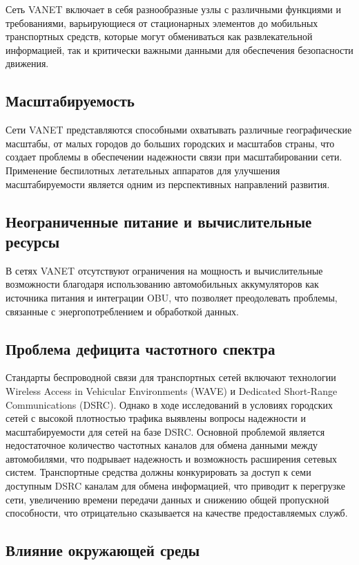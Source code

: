 Сеть VANET включает в себя разнообразные узлы с различными функциями и требованиями, варьирующиеся от стационарных элементов до мобильных транспортных средств, которые могут обмениваться как развлекательной информацией, так и критически важными данными для обеспечения безопасности движения.

\subsection*{Масштабируемость}

Сети VANET представляются способными охватывать различные географические масштабы, от малых городов до больших городских и масштабов страны, что создает проблемы в обеспечении надежности связи при масштабировании сети. Применение беспилотных летательных аппаратов для улучшения масштабируемости является одним из перспективных направлений развития.

\subsection*{Неограниченные питание и вычислительные ресурсы}

В сетях VANET отсутствуют ограничения на мощность и вычислительные возможности благодаря использованию автомобильных аккумуляторов как источника питания и интеграции OBU, что позволяет преодолевать проблемы, связанные с энергопотреблением и обработкой данных.

\subsection*{Проблема дефицита частотного спектра}

Стандарты беспроводной связи для транспортных сетей включают технологии Wireless Access in Vehicular Environments (WAVE) и Dedicated Short-Range Communications (DSRC). Однако в ходе исследований в условиях городских сетей с высокой плотностью трафика выявлены вопросы надежности и масштабируемости для сетей на базе DSRC. Основной проблемой является недостаточное количество частотных каналов для обмена данными между автомобилями, что подрывает надежность и возможность расширения сетевых систем. Транспортные средства должны конкурировать за доступ к семи доступным DSRC каналам для обмена информацией, что приводит к перегрузке сети, увеличению времени передачи данных и снижению общей пропускной способности, что отрицательно сказывается на качестве предоставляемых служб.

\subsection*{Влияние окружающей среды}

